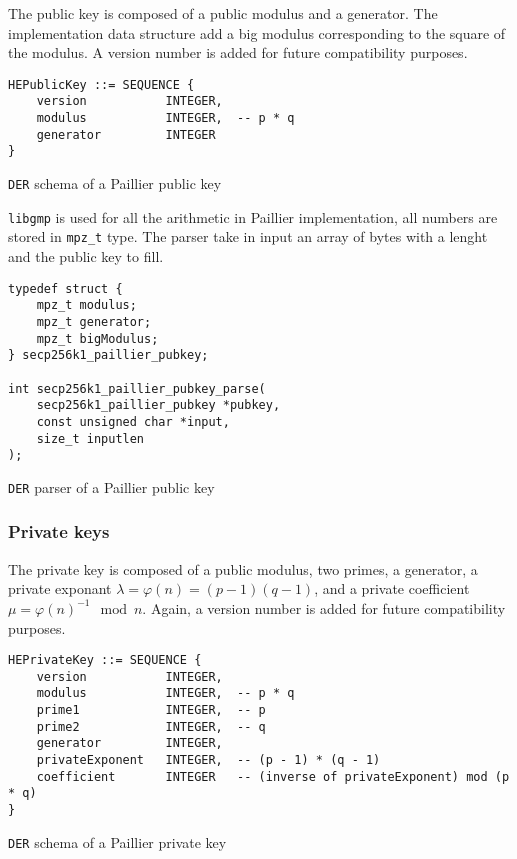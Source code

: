 The public key is composed of a public modulus and a generator. The implementation
data structure add a big modulus corresponding to the square of the modulus. A
version number is added for future compatibility purposes.

\begin{listing}
  \begin{verbatim}
HEPublicKey ::= SEQUENCE {
    version           INTEGER,
    modulus           INTEGER,  -- p * q
    generator         INTEGER
}
  \end{verbatim}
	\caption{\texttt{DER} schema of a Paillier public key}
	\label{lst:DERSchemaPaillierPub}
\end{listing}

\texttt{libgmp} is used for all the arithmetic in Paillier implementation, all numbers are
stored in \texttt{mpz\_t} type. The parser take in input an array of bytes with a
lenght and the public key to fill.

\begin{listing}
  \begin{verbatim}
typedef struct {
    mpz_t modulus;
    mpz_t generator;
    mpz_t bigModulus;
} secp256k1_paillier_pubkey;

int secp256k1_paillier_pubkey_parse(
    secp256k1_paillier_pubkey *pubkey,
    const unsigned char *input,
    size_t inputlen
);
  \end{verbatim}
	\caption{\texttt{DER} parser of a Paillier public key}
	\label{lst:DERImplPaillierParsePub}
\end{listing}


\subsubsection{Private keys}

The private key is composed of a public modulus, two primes, a generator, a
private exponant $\lambda = \varphi(n) = (p-1)(q-1)$, and a private coefficient
$\mu = \varphi(n)^{-1} \mod n$. Again, a version number is added for future
compatibility purposes.

\begin{listing}
  \begin{verbatim}
HEPrivateKey ::= SEQUENCE {
    version           INTEGER,
    modulus           INTEGER,  -- p * q
    prime1            INTEGER,  -- p
    prime2            INTEGER,  -- q
    generator         INTEGER,
    privateExponent   INTEGER,  -- (p - 1) * (q - 1)
    coefficient       INTEGER   -- (inverse of privateExponent) mod (p * q)
}
  \end{verbatim}
	\caption{\texttt{DER} schema of a Paillier private key}
	\label{lst:DERSchemaPaillierPriv}
\end{listing}

